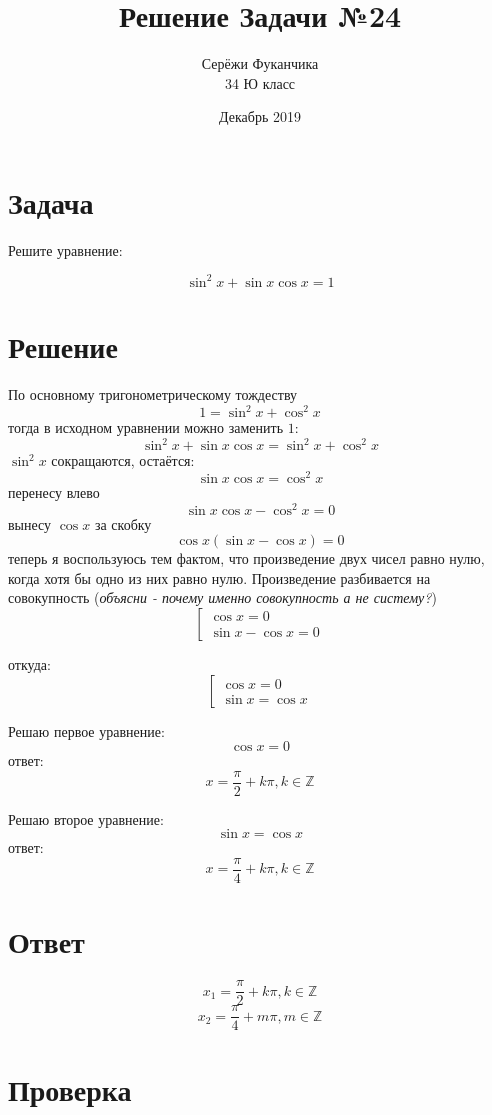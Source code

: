 \documentclass{article}
\title{Решение Задачи №24}
\author{Серёжи Фуканчика\\34 Ю класс}
\date{Декабрь 2019}
\begin{document}
\maketitle

\section{Задача}
Решите уравнение:

$$\sin^2{}x + \sin{}x{}\cos{}x = 1$$

\section{Решение}
По основному тригонометрическому тождеству
$$1=\sin^2{x}+\cos^2{x}$$
тогда в исходном уравнении можно заменить $1$:
$$\sin^2{}x + \sin{}x{}\cos{}x = \sin^2{x}+\cos^2{x}$$
$\sin^2{x}$ сокращаются, остаётся:
$$\sin{}x{}\cos{}x = \cos^2{x}$$
перенесу влево
$$\sin{}x{}\cos{}x - \cos^2{x}=0$$
вынесу $\cos{x}$ за скобку
$$\cos{}x(\sin{}x - \cos{x}) = 0$$
теперь я воспользуюсь тем фактом, что произведение двух чисел равно нулю, когда хотя бы одно из них равно нулю. Произведение разбивается на совокупность (\textit{объясни - почему именно совокупность а не систему?})
\begin{equation*}
\left[
\begin{array}{l}
\cos{}x  = 0 \\
\sin{}x - \cos{}x = 0
\end{array}
\right.
\end{equation*}

откуда:
\begin{equation*}
\left[
\begin{array}{l}
\cos{}x  = 0 \\
\sin{}x = \cos{}x
\end{array}
\right.
\end{equation*}

Решаю первое уравнение:
$$
\cos{x} = 0
$$
ответ:
$$
x=\frac{\pi}{2}+k\pi, k\in\mathbb{Z}
$$

Решаю второе уравнение:
$$
\sin{x}=\cos{x}
$$
ответ:
$$
x=\frac{\pi}{4}+k\pi, k\in\mathbb{Z}
$$

\section{Ответ}
$$
x_1=\frac{\pi}{2}+k\pi, k\in\mathbb{Z}
$$
$$
x_2=\frac{\pi}{4}+m\pi, m\in\mathbb{Z}
$$

\section{Проверка}
\end{document}
